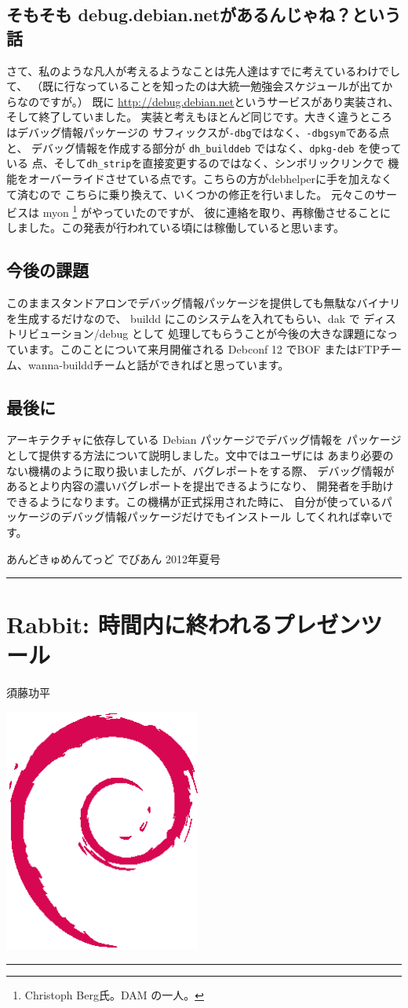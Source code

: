 \documentclass[mingoth,a4paper]{jsarticle}
\renewcommand{\dancersection}[2]{%
\newpage
あんどきゅめんてっど でびあん 2012年夏号
%
\vspace{0.1mm}\\
{\color{dancerdarkblue}\rule{\hsize}{2mm}}

%
%
\begin{minipage}[t]{0.6\hsize}
\color{dancerdarkblue}
\vspace{1cm}
\section{#1}
\hfill{}#2\\
\end{minipage}
\begin{minipage}[t]{0.4\hsize}
\vspace{-2cm}
\hfill{}\includegraphics[height=8cm]{image200502/openlogo-nd.eps}\\
\vspace{-5cm}
\end{minipage}
%
{\color{dancerlightblue}\rule{0.66\hsize}{2mm}}
%
\vspace{2cm}
}
\begin{document}
\subsection{そもそも debug.debian.netがあるんじゃね？という話}
さて、私のような凡人が考えるようなことは先人達はすでに考えているわけでして、
（既に行なっていることを知ったのは大統一勉強会スケジュールが出てからなのですが。）
既に \url{http://debug.debian.net}というサービスがあり実装され、そして終了していました。
実装と考えもほとんど同じです。大きく違うところはデバッグ情報パッケージの
サフィックスが\texttt{-dbg}ではなく、\texttt{-dbgsym}である点と、
デバッグ情報を作成する部分が \texttt{dh\_builddeb} ではなく、\texttt{dpkg-deb} を使っている
点、そして\texttt{dh\_strip}を直接変更するのではなく、シンボリックリンクで
機能をオーバーライドさせている点です。こちらの方がdebhelperに手を加えなくて済むので
こちらに乗り換えて、いくつかの修正を行いました。
元々このサービスは myon \footnote{Christoph Berg氏。DAM の一人。} がやっていたのですが、
彼に連絡を取り、再稼働させることにしました。この発表が行われている頃には稼働していると思います。

\subsection{今後の課題}

このままスタンドアロンでデバッグ情報パッケージを提供しても無駄なバイナリを生成するだけなので、
buildd にこのシステムを入れてもらい、dak で ディストリビューション/debug として
処理してもらうことが今後の大きな課題になっています。このことについて来月開催される Debconf 12
でBOF またはFTPチーム、wanna-builddチームと話ができればと思っています。

\subsection{最後に}
アーキテクチャに依存している Debian パッケージでデバッグ情報を
パッケージとして提供する方法について説明しました。文中ではユーザには
あまり必要のない機構のように取り扱いましたが、バグレポートをする際、
デバッグ情報があるとより内容の濃いバグレポートを提出できるようになり、
開発者を手助けできるようになります。この機構が正式採用された時に、
自分が使っているパッケージのデバッグ情報パッケージだけでもインストール
してくれれば幸いです。

\dancersection{Rabbit: 時間内に終われるプレゼンツール}{須藤功平}
\label{sec:Rabbit}
\end{document}

